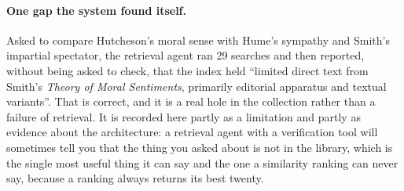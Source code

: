 \paragraph{One gap the system found itself.}
Asked to compare Hutcheson's moral sense with Hume's sympathy and Smith's
impartial spectator, the retrieval agent ran 29 searches and then reported,
without being asked to check, that the index held ``limited direct text from
Smith's \emph{Theory of Moral Sentiments}, primarily editorial apparatus and
textual variants''. That is correct, and it is a real hole in the
collection rather than a failure of retrieval. It is recorded here partly as a
limitation and partly as evidence about the architecture: a retrieval agent
with a verification tool will sometimes tell you that the thing you asked
about is not in the library, which is the single most useful thing it can say
and the one a similarity ranking can never say, because a ranking always
returns its best twenty.
